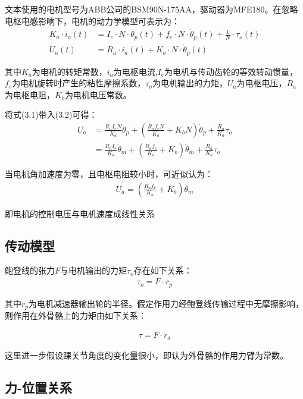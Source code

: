 文本使用的电机型号为ABB公司的BSM90N-175AA，驱动器为MFE180。在忽略电枢电感影响下，电机的动力学模型可表示为：
\begin{align}
K_{a} \cdot i_{a}(t)&=I_{e} \cdot N \cdot \ddot{\theta}_{p}(t)+f_{e} \cdot N \cdot \dot{\theta}_{p}(t)+\frac{1}{N} \cdot \tau_{o}(t) \\ 
U_{a}(t)&=R_{a} \cdot i_{a}(t)+K_{b} \cdot N \cdot \dot{\theta}_{p}(t)
\end{align}

其中$K_a$为电机的转矩常数，$i_a$为电枢电流,$I_e$为电机与传动齿轮的等效转动惯量，$f_e$为电机旋转时产生的粘性摩擦系数，$\tau_o$为电机输出的力矩，$U_a$为电枢电压，$R_a$为电枢电阻，$K_b$为电机电压常数。

将式(3.1)带入(3.2)可得：
\begin{align} U_{a} &=\frac{R_{a} I_{e} N}{K_{a}} \ddot{\theta}_{p}+\left(\frac{R_{a} f_{e} N}{K_{a}}+K_{b} N\right) \dot{\theta}_{p}+\frac{R_{a}}{K_{a}} \tau_{o} \\ &=\frac{R_{a} I_{e}}{K_{a}} \ddot{\theta}_{m}+\left(\frac{R_{a} f_{e}}{K_{a}}+K_{b}\right) \dot{\theta}_{m}+\frac{R_{a}}{K_{a}} \tau_{o} 
\end{align}

当电机角加速度为零，且电枢电阻较小时，可近似认为：
\begin{align}
U_{a}=\left(\frac{R_{a} f_{e}}{K_{a}}+K_{b}\right) \dot{\theta}_{m}
\end{align}

即电机的控制电压与电机速度成线性关系

\subsection{传动模型}

鲍登线的张力$F$与电机输出的力矩$\tau_o$存在如下关系：
\begin{align}
    \tau_o = F\cdot r_p
\end{align}

其中$r_p$为电机减速器输出轮的半径。假定作用力经鲍登线传输过程中无摩擦影响，则作用在外骨骼上的力矩由如下关系：

\begin{align}
    \tau = F\cdot r_a
\end{align}

这里进一步假设踝关节角度的变化量很小，即认为外骨骼的作用力臂为常数。

\subsection{力-位置关系}

